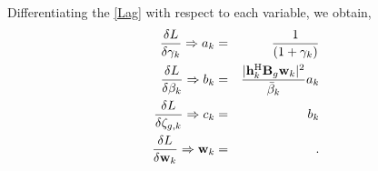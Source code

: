 \documentclass[letterpaper,conference,10pt]{IEEEtran}
\begin{document}
	Differentiating the \eqref{Lag} with respect to each variable, we obtain,
	\begin{eqnarray}
		\frac{\delta L} {\delta \gamma_k} \Rightarrow a_k &=& \frac{1}{(1+ \gamma_k)}\\
		\frac{\delta L}{\delta \beta_k} \Rightarrow b_k &=& \frac{| \mathbf{h}_{k}^{\mathrm{H}} \mathbf{B}_g \mathbf{w}_{k} |^2}{\bar{\beta}_k} a_k \\
		\frac{\delta L}{\delta \zeta_{g,k}} \Rightarrow c_k &=& b_k \\
		\frac{\delta L}{\delta \mathbf{w}_k} \Rightarrow \mathbf{w}_k &=&  .
	\end{eqnarray}
	
	

	
\end{document}
